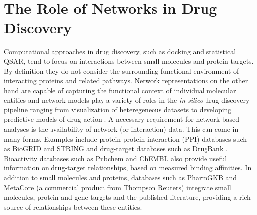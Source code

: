 \documentclass[]{book}
\begin{document}
\section{The Role of Networks in Drug Discovery}  
\label{sec:role-networks-drug}

Computational approaches in drug discovery, such as docking and
statistical QSAR, tend to focus on interactions between small
molecules and protein targets. By definition they do not consider the
surrounding functional environment of interacting proteins and related
pathways. Network representations on the other hand are capable of
capturing the functional context of individual molecular entities and
network models play a variety of roles in the \emph{in silico} drug  
discovery pipeline ranging from visualization of heteregeneous
datasets \cite{Huan:2010cy,Kuhn:2010zr} to developing predictive
models of drug action \cite{Vina:2009oq,Folger:2011tx}. A necessary
requirement for network based analyses is the availability of network
(or interaction) data. This can come in many forms. Examples include
protein-protein interaction (PPI) databases such as BioGRID
\cite{Chatr-Aryamontri:2015yf} and STRING \cite{Franceschini:2013qa}
and drug-target databases such as DrugBank
\cite{Wishart:2008aa}. Bioactivity databases such as Pubchem and
ChEMBL \cite{Gaulton:2012jl} also provide useful information on
drug-target relationships, based on measured binding affinities.  In
addition to small molecules and proteins, databases such as PharmGKB
\cite{Thorn:2005aa} and MetaCore (a commercial product from Thompson
Reuters) integrate small molecules, protein and gene targets and the
published literature, providing a rich source of relationships between
these entities.
\end{document}
